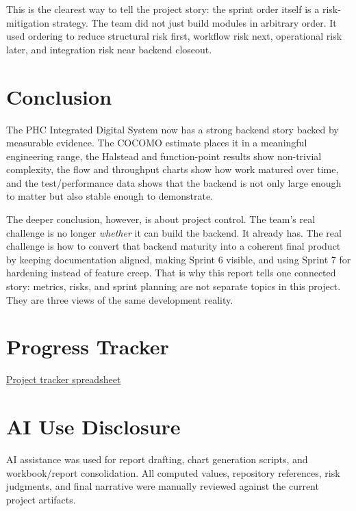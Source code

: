 \documentclass[11pt,a4paper]{article}
\begin{document}
This is the clearest way to tell the project story: the sprint order itself is a risk-mitigation strategy. The team did not just build modules in arbitrary order. It used ordering to reduce structural risk first, workflow risk next, operational risk later, and integration risk near backend closeout.

\section{Conclusion}
The PHC Integrated Digital System now has a strong backend story backed by measurable evidence. The COCOMO estimate places it in a meaningful engineering range, the Halstead and function-point results show non-trivial complexity, the flow and throughput charts show how work matured over time, and the test/performance data shows that the backend is not only large enough to matter but also stable enough to demonstrate.

The deeper conclusion, however, is about project control. The team’s real challenge is no longer \emph{whether} it can build the backend. It already has. The real challenge is how to convert that backend maturity into a coherent final product by keeping documentation aligned, making Sprint 6 visible, and using Sprint 7 for hardening instead of feature creep. That is why this report tells one connected story: metrics, risks, and sprint planning are not separate topics in this project. They are three views of the same development reality.

\section*{Progress Tracker}
\href{https://docs.google.com/spreadsheets/d/1xLa2L8eWv8gfrIwPXrnImF8uManlRlRwRp3ksSOVI9E/edit?usp=sharing}{Project tracker spreadsheet}

\section*{AI Use Disclosure}
AI assistance was used for report drafting, chart generation scripts, and workbook/report consolidation. All computed values, repository references, risk judgments, and final narrative were manually reviewed against the current project artifacts.
\end{document}
